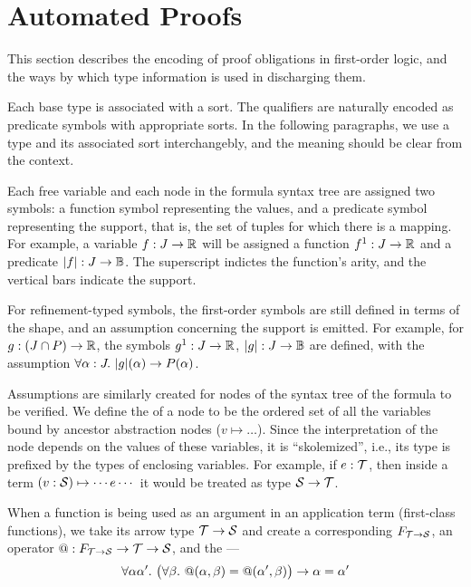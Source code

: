 \section{Automated Proofs}

This section describes the encoding of proof obligations in first-order logic,
and the ways by which type information is used in discharging them.

Each base type is associated with a sort. The qualifiers are naturally encoded
as predicate symbols with appropriate sorts. In the following paragraphs, we
use a type and its associated sort interchangebly, and the meaning should be clear
from the context.

Each free variable and each node in the formula syntax tree are assigned two
symbols: a function symbol representing the values, and a predicate symbol
representing the support, that is, the set of tuples for which there is a mapping.
For example, a variable $f : J\to\R$ will be assigned a function $f^1: J\to\R$
and a predicate $|f|: J\to\B$. The superscript indictes the function's arity,
and the vertical bars indicate the support.

For refinement-typed symbols, the first-order symbols are still defined in terms
of the shape, and an assumption concerning the support is emitted. For example,
for $g: (J\cap P)\to\R$, the symbols $g^1:J\to\R$, $|g|:J\to\B$ are defined,
with the assumption $\forall \alpha:J.~|g|(\alpha)\limplies P(\alpha)$.

Assumptions are similarly created for nodes of the syntax tree of the formula to
be verified. We define the  of a node to be the ordered set of
all the variables bound by ancestor abstraction nodes ($v\mapsto\ldots$). Since
the interpretation of the node depends on the values of these variables, it is
``skolemized'', i.e., its type is prefixed by the types of enclosing variables.
For example, if $e:\T$, then inside a term $(v:\S)\mapsto \cdots e\cdots$ it would be treated as
type $\S\to\T$.

When a function is being used as an argument in an application term (first-class functions), 
we take its arrow type $\T\to\S$ and create a corresponding  $F_{\T\to\S}$,
an operator $@ : F_{\T\to\S}\to\T\to\S$, and the  ---
\begin{equation}
\forall \alpha\alpha'.~ \big(\forall\beta.~ @(\alpha,\beta)=@(\alpha',\beta)\big)\limplies \alpha=\alpha'
\label{automated:extensionality}
\end{equation}

